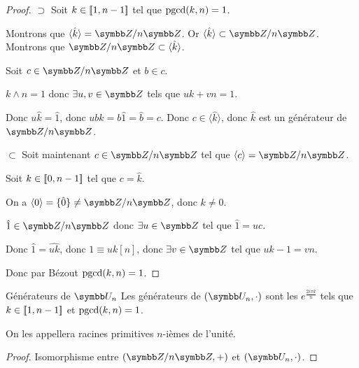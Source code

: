 
\begin{proof}
    $\supset$ Soit $k \in [\![1, n-1]\!]$ tel que $\operatorname{pgcd}(k, n) = 1$.

    Montrons que $\langle \hat k \rangle = \Z / n \Z$.
    Or $\langle \hat k \rangle \subset \Z/n\Z$.
    Montrons que $\Z/n\Z \subset \langle \hat k \rangle$.

    Soit $c \in \Z / n \Z$ et $b \in c$.

    $k \wedge n = 1$ donc $\exists u, v \in \Z$ tels que $uk + vn = 1$.

    Donc $u\hat k = \hat 1$, donc $ub \hat k = b \hat 1 = \hat b = c$. Donc $c \in \langle \hat k \rangle$, 
    donc $\hat k$ est un générateur de $\Z / n \Z$.

    \avspace $\subset$ Soit maintenant $c \in \Z / n \Z$ tel que $\langle c \rangle = \Z / n \Z$.

    Soit $k \in [\![0, n-1]\!]$ tel que $c = \hat k$.

    On a $\langle 0 \rangle = \{\hat 0\} \neq \Z / n \Z$, donc $k \neq 0$.

    $\hat 1 \in \Z / n \Z$ donc $\exists u \in \Z$ tel que $\hat 1 = u c$. 

    Donc $\hat 1 = \widehat{uk}$, donc $1 \equiv uk [n]$, donc $\exists v \in \Z$ tel que $uk - 1 = vn$.

    Donc par Bézout $\operatorname{pgcd}(k, n) = 1$.
\end{proof}

\begin{corollaire}{Générateurs de $\symbb U_n$}{}
    Les générateurs de $(\symbb U_n, \cdot)$ sont les $e^{\frac{2i\pi k} n}$ tels que 
    $k \in [\![1, n-1]\!]$ et $\operatorname{pgcd}(k, n) = 1$.

    On les appellera racines primitives $n$-ièmes de l'unité.
\end{corollaire}

\begin{proof}
    Isomorphisme entre $(\Z / n \Z, +)$ et $(\symbb U_n, \cdot)$.
\end{proof}

